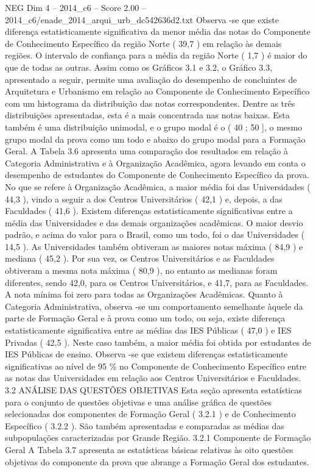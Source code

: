 \begin{textsample}{NEG Dim 4 – 2014\_c6 – Score 2.00 – 2014\_c6/enade\_2014\_arqui\_urb\_dc542636d2.txt}
Observa -se que existe diferença estatisticamente significativa da menor média das notas do Componente de Conhecimento Específico da região Norte ( 39,7 ) em relação às demais regiões.
O intervalo de confiança para a média da região Norte ( 1,7 ) é maior do que de todas as outras.
Assim como os Gráficos 3.1 e 3.2, o Gráfico 3.3, apresentado a seguir, permite uma avaliação do desempenho de concluintes de Arquitetura e Urbanismo em relação ao Componente de Conhecimento Específico com um histograma da distribuição das notas correspondentes.
Dentre as três distribuições apresentadas, esta é a mais concentrada nas notas baixas.
Esta também é uma distribuição unimodal, e o grupo modal é o ( 40 ; 50 ], o mesmo grupo modal da prova como um todo e abaixo do grupo modal para a Formação Geral.
A Tabela 3.6 apresenta uma comparação dos resultados em relação à Categoria Administrativa e à Organização Acadêmica, agora levando em conta o desempenho de estudantes do Componente de Conhecimento Específico da prova.
No que se refere à Organização Acadêmica, a maior média foi das Universidades ( 44,3 ), vindo a seguir a dos Centros Universitários ( 42,1 ) e, depois, a das Faculdades ( 41,6 ).
Existem diferenças estatisticamente significativas entre a média das Universidades e das demais organizações acadêmicas.
O maior desvio padrão, e acima do valor para o Brasil, como um todo, foi o das Universidades ( 14,5 ).
As Universidades também obtiveram as maiores notas máxima ( 84,9 ) e mediana ( 45,2 ).
Por sua vez, os Centros Universitários e as Faculdades obtiveram a mesma nota máxima ( 80,9 ), no entanto as medianas foram diferentes, sendo 42,0, para os Centros Universitários, e 41,7, para as Faculdades.
A nota mínima foi zero para todas as Organizações Acadêmicas.
Quanto à Categoria Administrativa, observa -se um comportamento semelhante àquele da parte de Formação Geral e à prova como um todo, ou seja, existe diferença estatisticamente significativa entre as médias das IES Públicas ( 47,0 ) e IES Privadas ( 42,5 ).
Neste caso também, a maior média foi obtida por estudantes de IES Públicas de ensino.
Observa -se que existem diferenças estatisticamente significativas ao nível de 95 \% no Componente de Conhecimento Específico entre as notas das Universidades em relação aos Centros Universitários e Faculdades. 3.2 ANÁLISE DAS QUESTÕES OBJETIVAS Esta seção apresenta estatísticas para o conjunto de questões objetivas e uma análise gráfica de questões selecionadas dos componentes de Formação Geral ( 3.2.1 ) e de Conhecimento Específico ( 3.2.2 ).
São também apresentadas e comparadas as médias das subpopulações caracterizadas por Grande Região. 3.2.1 Componente de Formação Geral A Tabela 3.7 apresenta as estatísticas básicas relativas às oito questões objetivas do componente da prova que abrange a Formação Geral dos estudantes.

\end{textsample}
